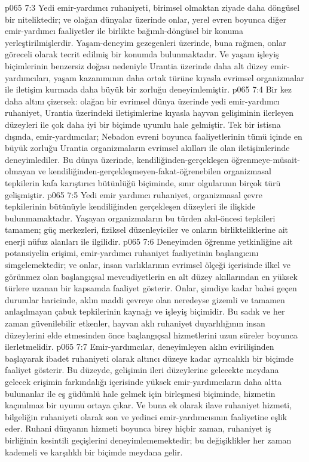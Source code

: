 \vs p065 7:3 Yedi emir\hyp{}yardımcı ruhaniyeti, birimsel olmaktan ziyade daha döngüsel bir niteliktedir; ve olağan dünyalar üzerinde onlar, yerel evren boyunca diğer emir\hyp{}yardımcı faaliyetler ile birlikte bağımlı\hyp{}döngüsel bir konuma yerleştirilmişlerdir. Yaşam\hyp{}deneyim gezegenleri üzerinde, buna rağmen, onlar göreceli olarak tecrit edilmiş bir konumda bulunmaktadır. Ve yaşam işleyiş biçimlerinin benzersiz doğası nedeniyle Urantia üzerinde daha alt düzey emir\hyp{}yardımcıları, yaşam kazanımının daha ortak türüne kıyasla evrimsel organizmalar ile iletişim kurmada daha büyük bir zorluğu deneyimlemiştir.
\vs p065 7:4 Bir kez daha altını çizersek: olağan bir evrimsel dünya üzerinde yedi emir\hyp{}yardımcı ruhaniyet, Urantia üzerindeki iletişimlerine kıyasla hayvan gelişiminin ilerleyen düzeyleri ile çok daha iyi bir biçimde uyumlu hale gelmiştir. Tek bir istisna dışında, emir\hyp{}yardımcılar; Nebadon evreni boyunca faaliyetlerinin tümü içinde en büyük zorluğu Urantia organizmaların evrimsel akılları ile olan iletişimlerinde deneyimlediler. Bu dünya üzerinde, kendiliğinden\hyp{}gerçekleşen öğrenmeye\hyp{}müsait\hyp{}olmayan ve kendiliğinden\hyp{}gerçekleşmeyen\hyp{}fakat\hyp{}öğrenebilen organizmasal tepkilerin kafa karıştırıcı bütünlüğü biçiminde, sınır olgularının birçok türü gelişmiştir.
\vs p065 7:5 Yedi emir yardımcı ruhaniyet, organizmasal çevre tepkilerinin bütünüyle kendiliğinden gerçekleşen düzeyleri ile ilişkide bulunmamaktadır. Yaşayan organizmaların bu türden akıl\hyp{}öncesi tepkileri tamamen; güç merkezleri, fiziksel düzenleyiciler ve onların birlikteliklerine ait enerji nüfuz alanları ile ilgilidir.
\vs p065 7:6 Deneyimden öğrenme yetkinliğine ait potansiyelin erişimi, emir\hyp{}yardımcı ruhaniyet faaliyetinin başlangıcını simgelemektedir; ve onlar, insan varlıklarının evrimsel ölçeği içerisinde ilkel ve görünmez olan başlangıçsal mevcudiyetlerin en alt düzey akıllarından en yüksek türlere uzanan bir kapsamda faaliyet gösterir. Onlar, şimdiye kadar bahsi geçen durumlar haricinde, aklın maddi çevreye olan neredeyse gizemli ve tamamen anlaşılmayan çabuk tepkilerinin kaynağı ve işleyiş biçimidir. Bu sadık ve her zaman güvenilebilir etkenler, hayvan aklı ruhaniyet duyarlılığının insan düzeylerini elde etmesinden önce başlangıçsal hizmetlerini uzun süreler boyunca ilerletmelidir.
\vs p065 7:7 Emir\hyp{}yardımcılar, deneyimleyen aklın evirilişinden başlayarak ibadet ruhaniyeti olarak altıncı düzeye kadar ayrıcalıklı bir biçimde faaliyet gösterir. Bu düzeyde, gelişimin ileri düzeylerine gelecekte meydana gelecek erişimin farkındalığı içerisinde yüksek emir\hyp{}yardımcıların daha altta bulunanlar ile eş güdümlü hale gelmek için birleşmesi biçiminde, hizmetin kaçınılmaz bir uyumu ortaya çıkar. Ve buna ek olarak ilave ruhaniyet hizmeti, bilgeliğin ruhaniyeti olarak son ve yedinci emir\hyp{}yardımcısının faaliyetine eşlik eder. Ruhani dünyanın hizmeti boyunca birey hiçbir zaman, ruhaniyet iş birliğinin kesintili geçişlerini deneyimlememektedir; bu değişiklikler her zaman kademeli ve karşılıklı bir biçimde meydana gelir.
